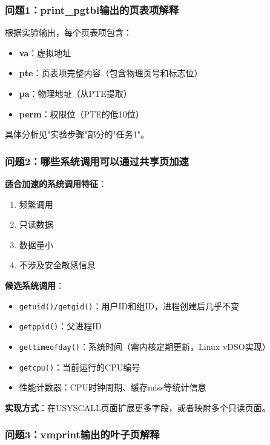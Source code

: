 \subsubsection{问题1：print\_pgtbl输出的页表项解释}

根据实验输出，每个页表项包含：

\begin{itemize}
    \item \textbf{va}：虚拟地址
    \item \textbf{pte}：页表项完整内容（包含物理页号和标志位）
    \item \textbf{pa}：物理地址（从PTE提取）
    \item \textbf{perm}：权限位（PTE的低10位）
\end{itemize}

具体分析见"实验步骤"部分的"任务1"。

\subsubsection{问题2：哪些系统调用可以通过共享页加速}

\textbf{适合加速的系统调用特征}：
\begin{enumerate}
    \item 频繁调用
    \item 只读数据
    \item 数据量小
    \item 不涉及安全敏感信息
\end{enumerate}

\textbf{候选系统调用}：

\begin{itemize}
    \item \texttt{getuid()/getgid()}：用户ID和组ID，进程创建后几乎不变
    \item \texttt{getppid()}：父进程ID
    \item \texttt{gettimeofday()}：系统时间（需内核定期更新，Linux vDSO实现）
    \item \texttt{getcpu()}：当前运行的CPU编号
    \item 性能计数器：CPU时钟周期、缓存miss等统计信息
\end{itemize}

\textbf{实现方式}：在USYSCALL页面扩展更多字段，或者映射多个只读页面。

\subsubsection{问题3：vmprint输出的叶子页解释}

